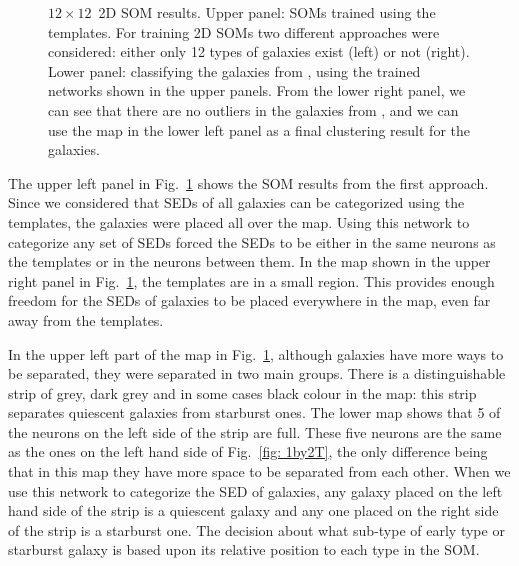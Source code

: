 \begin{figure}
        \caption{$12\times12$~2D SOM results. Upper panel: SOMs trained using the  templates. For training 2D SOMs two different approaches were considered: either only 12 types of galaxies exist (left) or not (right). Lower panel: classifying the galaxies from , using the trained networks shown in the upper panels. From the lower right panel, we can see that there are no outliers in the galaxies from , and we can use the map in the lower left panel as a final clustering result for the  galaxies.}
        \label{fig: 12by12}
    \end{figure}
    
    The upper left panel in Fig.~\ref{fig: 12by12} shows the SOM results from the first approach. 
    Since we considered that SEDs of all galaxies can be categorized using the  templates, the galaxies were placed all over the map.
    Using this network to categorize any set of SEDs forced the SEDs to be either in the same neurons as the  templates or in the neurons between them.
    In the map shown in the upper right panel in Fig.~\ref{fig: 12by12}, the  templates are in a small region. This provides enough freedom for the SEDs of galaxies to be placed everywhere in the map, even far away from the templates.
    
    
    In the upper left part of the map in Fig.~\ref{fig: 12by12}, although galaxies have more ways to be separated, they were separated in two main groups.
    There is a distinguishable strip of grey, dark grey and in some cases black colour in the map:
    this strip separates quiescent galaxies from starburst ones.
    The lower map shows that 5 of the neurons on the left side of the strip are full. 
    These five neurons are the same as the ones on the left hand side of Fig.~\ref{fig: 1by2T},
    the only difference being that in this map they have more space to be separated from each other.
    When we use this network to categorize the SED of galaxies, any galaxy placed on the left hand side of the strip is a quiescent galaxy and any one placed on the right side of the strip is a starburst one.
    The decision about what sub-type of early type or starburst galaxy is based upon its relative position to each type in the SOM.
    
